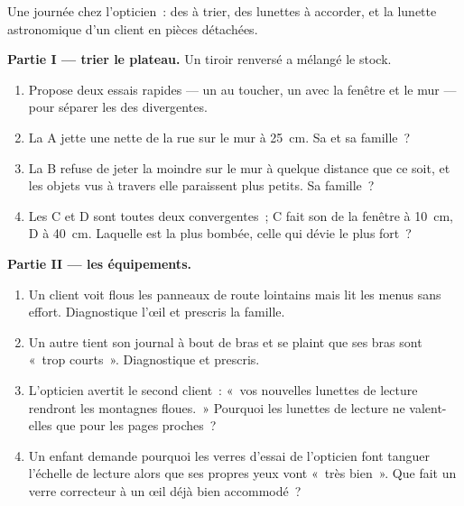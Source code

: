 \begin{problem}\label{pb:g8:lenses-images:1}
Une journée chez l'opticien~: des  à trier, des lunettes à
accorder, et la lunette astronomique d'un client en pièces
détachées.

\medskip\noindent\textbf{Partie I --- trier le plateau.}
Un tiroir renversé a mélangé le stock.
\begin{enumerate}
  \item Propose deux essais rapides --- un au toucher, un avec la
        fenêtre et le mur --- pour séparer les  des divergentes.
  \item La  A jette une  nette de la rue sur le mur à
        \qty{25}{cm}. Sa  et sa famille~?
  \item La  B refuse de jeter la moindre  sur le mur à
        quelque distance que ce soit, et les objets vus à travers
        elle paraissent plus petits. Sa famille~?
  \item Les  C et D sont toutes deux convergentes~; C fait
        son  de la fenêtre à \qty{10}{cm}, D à \qty{40}{cm}.
        Laquelle est la plus bombée, celle qui dévie le plus fort~?
\end{enumerate}

\medskip\noindent\textbf{Partie II --- les équipements.}
\begin{enumerate}[resume]
  \item Un client voit flous les panneaux de route lointains mais
        lit les menus sans effort. Diagnostique l'œil et prescris
        la famille.
  \item Un autre tient son journal à bout de bras et se plaint que
        ses bras sont «~trop courts~». Diagnostique et prescris.
  \item L'opticien avertit le second client~: «~vos nouvelles
        lunettes de lecture rendront les montagnes floues.~»
        Pourquoi les lunettes de lecture ne valent-elles que pour
        les pages proches~?
  \item Un enfant demande pourquoi les verres d'essai de l'opticien
        font tanguer l'échelle de lecture alors que ses propres
        yeux vont «~très bien~». Que fait un verre correcteur à un
        œil déjà bien accommodé~?
\end{enumerate}


\end{problem}
